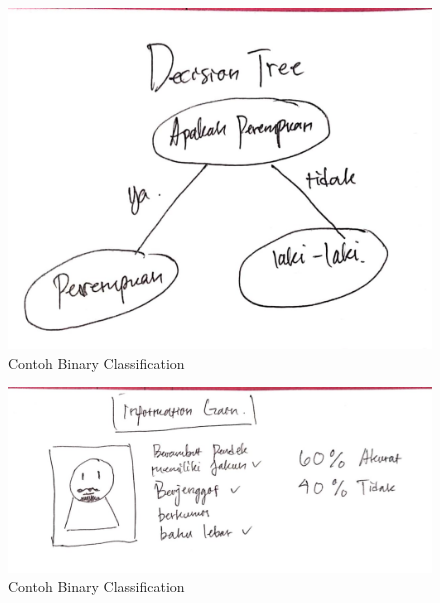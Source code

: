 \begin{figure}[ht]
      \centerline{\includegraphics[width=1\textwidth]
      {figures/c17}}
      \caption{Contoh Binary Classification}
      \label{c17}
      \end{figure}

\begin{figure}[ht]
      \centerline{\includegraphics[width=1\textwidth]
      {figures/c18}}
      \caption{Contoh Binary Classification}
      \label{c18}
      \end{figure}


 